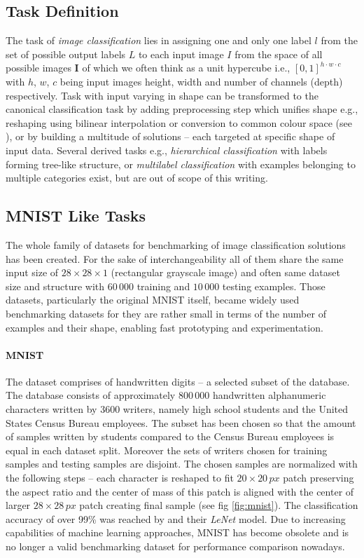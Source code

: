 \subsection{Task Definition}
The task of \emph{image classification} lies in assigning one and only one label $l$ from the set of possible output labels $L$ to each input image $I$ from the space of all possible images $\mathbf{I}$ of which we often think as a unit hypercube i.e., $[0,1]^{h \cdot w \cdot c}$ with $h$, $w$, $c$ being input images height, width and number of channels (depth) respectively. Task with input varying in shape can be transformed to the canonical classification task by adding preprocessing step which unifies shape e.g., reshaping using bilinear interpolation or conversion to common colour space (see \cite{computer_vision}), or by building a multitude of solutions -- each targeted at specific shape of input data. Several derived tasks e.g., \emph{hierarchical classification} with labels forming tree-like structure, or \emph{multilabel classification} with examples belonging to multiple categories exist, but are out of scope of this writing.

\subsection{MNIST Like Tasks}
\label{subsec:mnist_tasks}
The whole family of datasets for benchmarking of image classification solutions has been created. For the sake of interchangeability all of them share the same input size of $28 \times 28 \times 1$ (rectangular grayscale image) and often same dataset size and structure with $60\,000$ training and $10\,000$ testing examples. Those datasets, particularly the original MNIST itself, became widely used benchmarking datasets for they are rather small in terms of the number of examples and their shape, enabling fast prototyping and experimentation.

\paragraph{MNIST}

The dataset comprises of handwritten digits -- a selected subset of the \cite{NIST_19} database. The database consists of approximately $800\,000$ handwritten alphanumeric characters written by 3600 writers, namely high school students and the United States Census Bureau employees. The subset has been chosen so that the amount of samples written by students compared to the Census Bureau employees is equal in each dataset split. Moreover the sets of writers chosen for training samples and testing samples are disjoint. The chosen samples are normalized with the following steps -- each character is reshaped to fit $20 \times 20\,px$ patch preserving the aspect ratio and the center of mass of this patch is aligned with the center of larger $28 \times 28\,px$ patch creating final sample (see fig \ref{fig:mnist}). The classification accuracy of over 99\% was reached by \cite{Lecun98gradient-basedlearning} and their \emph{LeNet} model. Due to increasing capabilities of machine learning approaches, MNIST has become obsolete and is no longer a valid benchmarking dataset for performance comparison nowadays.

